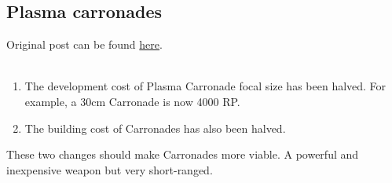 \documentclass[../../Aurora C# unofficial manual.tex]{subfiles}
\begin{document}
	\subsection{Plasma carronades}
	Original post can be found
	\href{http://aurora2.pentarch.org/index.php?topic=8495.msg102669#msg102669}{here}.
	\\\\
	
	
	\begin{enumerate}
		\item The development cost of Plasma Carronade focal size has been halved. For example, a 30cm Carronade is now 4000 RP.
		\item The building cost of Carronades has also been halved.
	\end{enumerate}
	These two changes should make Carronades more viable. A powerful and inexpensive weapon but very short-ranged.
\end{document}
